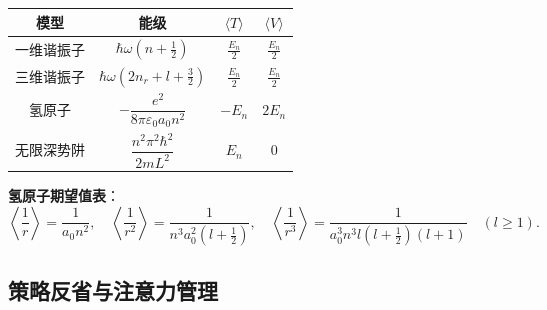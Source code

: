 \begin{cheatbox}
\begin{center}
\renewcommand{\arraystretch}{1.6}
\begin{tabular}{|c|c|c|c|}
\hline
\textbf{模型} & \textbf{能级} & \textbf{$\langle T\rangle$} & \textbf{$\langle V\rangle$} \\
\hline
一维谐振子 & $\hbar\omega(n+\frac{1}{2})$ & $\frac{E_n}{2}$ & $\frac{E_n}{2}$ \\
\hline
三维谐振子 & $\hbar\omega(2n_r+l+\frac{3}{2})$ & $\frac{E_n}{2}$ & $\frac{E_n}{2}$ \\
\hline
氢原子 & $-\dfrac{e^2}{8\pi\varepsilon_0 a_0 n^2}$ & $-E_n$ & $2E_n$ \\
\hline
无限深势阱 & $\dfrac{n^2\pi^2\hbar^2}{2mL^2}$ & $E_n$ & $0$ \\
\hline
\end{tabular}
\end{center}

\vspace{4pt}
\textbf{氢原子期望值表}：
\[
\left\langle\frac{1}{r}\right\rangle = \frac{1}{a_0 n^2}, \quad
\left\langle\frac{1}{r^2}\right\rangle = \frac{1}{n^3 a_0^2(l+\frac{1}{2})}, \quad
\left\langle\frac{1}{r^3}\right\rangle = \frac{1}{a_0^3 n^3 l(l+\frac{1}{2})(l+1)} \quad (l\geq 1).
\]
\end{cheatbox}

\subsection{策略反省与注意力管理}

